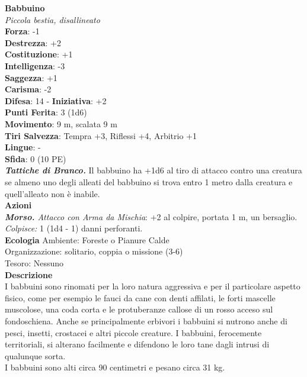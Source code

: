 \begin{multicols}{2}
\medskip\textbf{Babbuino}\\
\emph{Piccola bestia, disallineato}\\
\textbf{Forza}: -1\\
\textbf{Destrezza}: +2\\
\textbf{Costituzione}: +1\\
\textbf{Intelligenza}: -3\\
\textbf{Saggezza}: +1\\
\textbf{Carisma}: -2\\
\textbf{Difesa}: 14 - \textbf{Iniziativa}: +2\\
\textbf{Punti Ferita}: 3 (1d6)\\
\textbf{Movimento}: 9 m, scalata 9 m\\
\textbf{Tiri Salvezza}: Tempra +3, Riflessi +4, Arbitrio +1\\
\textbf{Lingue}: -\\
\textbf{Sfida}: 0 (10 PE)\smallskip\\
\emph{\textbf{Tattiche di Branco.}} Il babbuino ha +1d6 al tiro di attacco contro una creatura se almeno uno degli alleati del babbuino si trova entro 1 metro dalla creatura e quell'alleato non è inabile.\\
\smallskip\textbf{Azioni}\\
\emph{\textbf{Morso.} Attacco con Arma da Mischia}: +2 al colpire, portata 1 m, un bersaglio.\\
\emph{Colpisce:} 1 (1d4 - 1) danni perforanti.\\
\textbf{Ecologia}
Ambiente: Foreste o Pianure Calde\\
Organizzazione: solitario, coppia o missione (3-6)\\
Tesoro: Nessuno\\
\textbf{Descrizione}\\
I babbuini sono rinomati per la loro natura aggressiva e per il particolare aspetto fisico, come per esempio le fauci da cane con denti affilati, le forti mascelle muscolose, una coda corta e le protuberanze callose di un rosso acceso sul fondoschiena. Anche se principalmente erbivori i babbuini si nutrono anche di pesci, insetti, crostacei e altri piccole creature. I babbuini, ferocemente territoriali, si alterano facilmente e difendono le loro tane dagli intrusi di qualunque sorta.\\

I babbuini sono alti circa 90 centimetri e pesano circa 31 kg.\\


\end{multicols}
